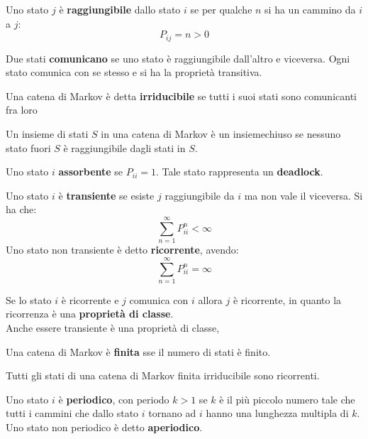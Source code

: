 \documentclass[a4paper,12pt, oneside]{book}
\begin{document}
\begin{definizione}
  Uno stato $j$ è \textbf{raggiungibile} dallo stato $i$ se per qualche $n$ si
  ha un cammino da $i$ a $j$:
  \[P_{ij}=n>0\]
\end{definizione}
\begin{definizione}
  Due stati \textbf{comunicano} se uno stato è raggiungibile dall'altro e
  viceversa. Ogni stato comunica con se stesso e si ha la proprietà transitiva.
\end{definizione}
\begin{definizione}
  Una catena di Markov è detta \textbf{irriducibile} se tutti i suoi stati sono
  comunicanti fra loro 
\end{definizione}
\begin{definizione}
  Un insieme di stati $S$ in una catena di Markov è un insiemechiuso se nessuno
  stato fuori $S$ è raggiungibile dagli stati in $S$. 
\end{definizione}
\begin{definizione}
  Uno stato $i$ \textbf{assorbente} se $P_{ii}=1$. Tale stato rappresenta un
  \textbf{deadlock}.
\end{definizione}
\begin{definizione}
  Uno stato $i$ è \textbf{transiente} se esiste $j$ raggiungibile da $i$ ma non
  vale il viceversa. Si ha che:
  \[\sum_{n=1}^\infty P_{ii}^n<\infty\]
  Uno stato non transiente è detto \textbf{ricorrente}, avendo:
  \[\sum_{n=1}^\infty P_{ii}^n=\infty\]
\end{definizione}
\begin{teorema}
  Se lo stato $i$ è ricorrente e $j$ comunica con $i$ allora $j$ è ricorrente,
  in quanto la ricorrenza è una \textbf{proprietà di classe}.\\
  Anche essere transiente è una proprietà di classe,
\end{teorema}
\begin{definizione}
  Una catena di Markov è \textbf{finita} sse il numero di stati è finito.
\end{definizione}
\begin{teorema}
  Tutti gli stati di una catena di Markov finita irriducibile sono ricorrenti.
\end{teorema}
\begin{definizione}
  Uno stato $i$ è \textbf{periodico}, con periodo $k>1$ se $k$ è il più piccolo
  numero tale che tutti i cammini che dallo stato $i$ tornano ad $i$ hanno una
  lunghezza multipla di $k$.\\
  Uno stato non periodico è detto \textbf{aperiodico}.
\end{definizione}
\end{document}
